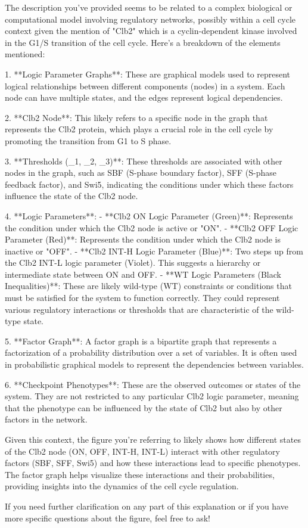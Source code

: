 The description you've provided seems to be related to a complex biological or computational model involving regulatory networks, possibly within a cell cycle context given the mention of "Clb2" which is a cyclin-dependent kinase involved in the G1/S transition of the cell cycle. Here's a breakdown of the elements mentioned:

1. **Logic Parameter Graphs**: These are graphical models used to represent logical relationships between different components (nodes) in a system. Each node can have multiple states, and the edges represent logical dependencies.

2. **Clb2 Node**: This likely refers to a specific node in the graph that represents the Clb2 protein, which plays a crucial role in the cell cycle by promoting the transition from G1 to S phase.

3. **Thresholds (_1, _2, _3)**: These thresholds are associated with other nodes in the graph, such as SBF (S-phase boundary factor), SFF (S-phase feedback factor), and Swi5, indicating the conditions under which these factors influence the state of the Clb2 node.

4. **Logic Parameters**:
   - **Clb2 ON Logic Parameter (Green)**: Represents the condition under which the Clb2 node is active or "ON".
   - **Clb2 OFF Logic Parameter (Red)**: Represents the condition under which the Clb2 node is inactive or "OFF".
   - **Clb2 INT-H Logic Parameter (Blue)**: Two steps up from the Clb2 INT-L logic parameter (Violet). This suggests a hierarchy or intermediate state between ON and OFF.
   - **WT Logic Parameters (Black Inequalities)**: These are likely wild-type (WT) constraints or conditions that must be satisfied for the system to function correctly. They could represent various regulatory interactions or thresholds that are characteristic of the wild-type state.

5. **Factor Graph**: A factor graph is a bipartite graph that represents a factorization of a probability distribution over a set of variables. It is often used in probabilistic graphical models to represent the dependencies between variables.

6. **Checkpoint Phenotypes**: These are the observed outcomes or states of the system. They are not restricted to any particular Clb2 logic parameter, meaning that the phenotype can be influenced by the state of Clb2 but also by other factors in the network.

Given this context, the figure you're referring to likely shows how different states of the Clb2 node (ON, OFF, INT-H, INT-L) interact with other regulatory factors (SBF, SFF, Swi5) and how these interactions lead to specific phenotypes. The factor graph helps visualize these interactions and their probabilities, providing insights into the dynamics of the cell cycle regulation.

If you need further clarification on any part of this explanation or if you have more specific questions about the figure, feel free to ask!